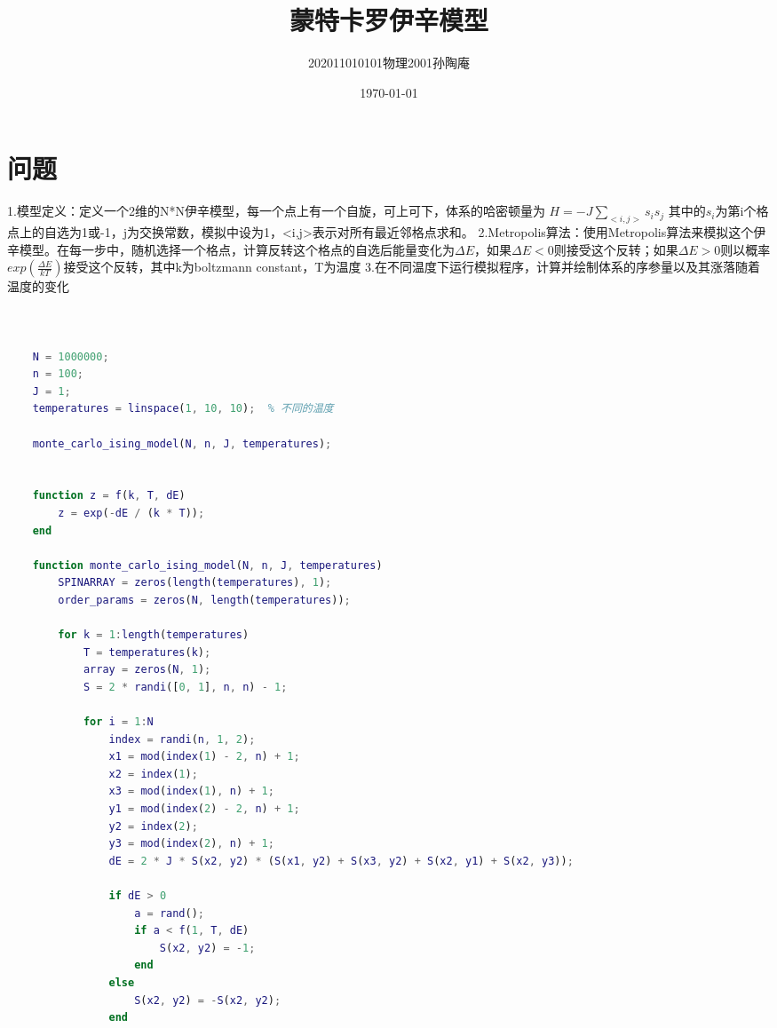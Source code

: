 \documentclass[12pt, a4paper, oneside]{ctexart}
\title{蒙特卡罗伊辛模型}
\date{\today}
\author{202011010101物理2001孙陶庵}
\begin{document}
\begin{spacing}{2.0}
\tableofcontents
\maketitle

\section{问题}
1.模型定义：定义一个2维的N*N伊辛模型，每一个点上有一个自旋，可上可下，体系的哈密顿量为
$\displaystyle H=-J\sum_{<i,j>}s_{i}s_{j}$
其中的$s_{i}$为第i个格点上的自选为1或-1，j为交换常数，模拟中设为1，<i,j>表示对所有最近邻格点求和。
2.Metropolis算法：使用Metropolis算法来模拟这个伊辛模型。在每一步中，随机选择一个格点，计算反转这个格点的自选后能量变化为$\Delta E$，如果$\Delta E<0$则接受这个反转；如果$\Delta E>0$则以概率$exp(\frac{\Delta E}{kT})$接受这个反转，其中k为boltzmann constant，T为温度
3.在不同温度下运行模拟程序，计算并绘制体系的序参量以及其涨落随着温度的变化
\section{}

\begin{lstlisting}[language=Matlab, caption={代码}]

    N = 1000000;
    n = 100;
    J = 1;
    temperatures = linspace(1, 10, 10);  % 不同的温度
    
    monte_carlo_ising_model(N, n, J, temperatures);
    
    
    function z = f(k, T, dE)
        z = exp(-dE / (k * T));
    end
    
    function monte_carlo_ising_model(N, n, J, temperatures)
        SPINARRAY = zeros(length(temperatures), 1);
        order_params = zeros(N, length(temperatures));
    
        for k = 1:length(temperatures)
            T = temperatures(k);
            array = zeros(N, 1);
            S = 2 * randi([0, 1], n, n) - 1;
    
            for i = 1:N
                index = randi(n, 1, 2);
                x1 = mod(index(1) - 2, n) + 1;
                x2 = index(1);
                x3 = mod(index(1), n) + 1;
                y1 = mod(index(2) - 2, n) + 1;
                y2 = index(2);
                y3 = mod(index(2), n) + 1;
                dE = 2 * J * S(x2, y2) * (S(x1, y2) + S(x3, y2) + S(x2, y1) + S(x2, y3));
    
                if dE > 0
                    a = rand();
                    if a < f(1, T, dE)
                        S(x2, y2) = -1;
                    end
                else
                    S(x2, y2) = -S(x2, y2);
                end
    

\end{lstlisting}
\end{spacing}
\end{document}
